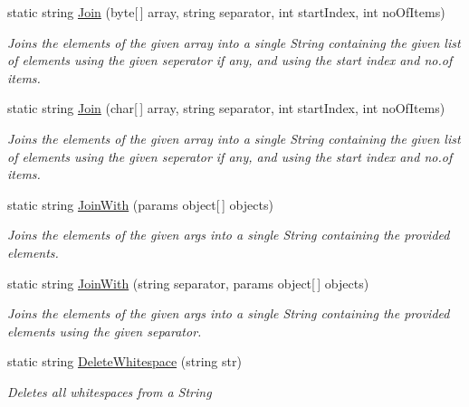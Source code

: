 \begin{DoxyCompactItemize}
static string \hyperlink{class_ultimate_1_1_utilities_1_1_string_utils_a4f76faaa655e24bf07a05cde446f4cca}{Join} (byte\mbox{[}$\,$\mbox{]} array, string separator, int start\+Index, int no\+Of\+Items)
\begin{DoxyCompactList}\small\item\em Joins the elements of the given array into a single String containing the given list of elements using the given seperator if any, and using the start index and no.\+of items. \end{DoxyCompactList}\item 
static string \hyperlink{class_ultimate_1_1_utilities_1_1_string_utils_ab4c25aee0ac62c925d013d839f03f83e}{Join} (char\mbox{[}$\,$\mbox{]} array, string separator, int start\+Index, int no\+Of\+Items)
\begin{DoxyCompactList}\small\item\em Joins the elements of the given array into a single String containing the given list of elements using the given seperator if any, and using the start index and no.\+of items. \end{DoxyCompactList}\item 
static string \hyperlink{class_ultimate_1_1_utilities_1_1_string_utils_a81c875e7e518a1c8b6ee689e983c01eb}{Join\+With} (params object\mbox{[}$\,$\mbox{]} objects)
\begin{DoxyCompactList}\small\item\em Joins the elements of the given args into a single String containing the provided elements. \end{DoxyCompactList}\item 
static string \hyperlink{class_ultimate_1_1_utilities_1_1_string_utils_a97cc531341348a6f2167c69649b09617}{Join\+With} (string separator, params object\mbox{[}$\,$\mbox{]} objects)
\begin{DoxyCompactList}\small\item\em Joins the elements of the given args into a single String containing the provided elements using the given separator. \end{DoxyCompactList}\item 
static string \hyperlink{class_ultimate_1_1_utilities_1_1_string_utils_a464e929c3499c1a59b84df86e910c403}{Delete\+Whitespace} (string str)
\begin{DoxyCompactList}\small\item\em Deletes all whitespaces from a String \end{DoxyCompactList}\item 

\end{DoxyCompactItemize}
